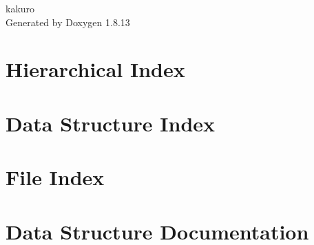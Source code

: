 \documentclass[twoside]{book}
\newcommand{\+}{\discretionary{\mbox{\scriptsize$\hookleftarrow$}}{}{}}
\newcommand{\clearemptydoublepage}{%
  \newpage{\pagestyle{empty}\cleardoublepage}%
}
\begin{document}
\begin{titlepage}
\vspace*{7cm}
\begin{center}%
{\Large kakuro }\\
\vspace*{1cm}
{\large Generated by Doxygen 1.8.13}\\
\end{center}
\end{titlepage}
\clearemptydoublepage
{}
\tableofcontents
\clearemptydoublepage
{}

\chapter{Hierarchical Index}

\chapter{Data Structure Index}

\chapter{File Index}

\chapter{Data Structure Documentation}



























\end{document}
